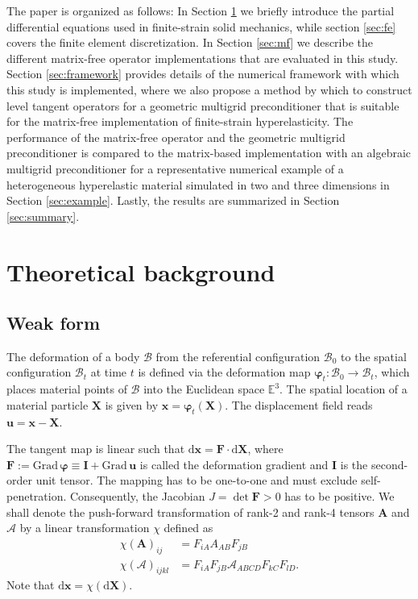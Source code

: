 \documentclass[AMA,STIX1COL]{WileyNJD-v2}
\newcommand*{\gz}[1]{\boldsymbol{#1}}
\newcommand*{\Grad}{\mathrm{Grad}}
\renewcommand*{\d}{\mathrm{d}}
\newcommand*{\mcl}[1]{\mathcal{#1}}
\begin{document}
The paper is organized as follows:
In Section \ref{sec:theory} we briefly introduce the partial differential equations used in finite-strain solid mechanics,
while section \ref{sec:fe} covers the finite element discretization.
In Section \ref{sec:mf} we describe the different matrix-free operator implementations that are evaluated in this study.
Section \ref{sec:framework} provides details of the numerical framework with which this study is implemented,
where we also propose a method by which to construct level tangent operators for
a geometric multigrid preconditioner that is suitable for the matrix-free implementation of finite-strain hyperelasticity.
%
The performance of the matrix-free operator and the geometric multigrid preconditioner is compared to the matrix-based implementation with an algebraic multigrid preconditioner for a representative numerical example of a heterogeneous hyperelastic material simulated in two and three dimensions in Section \ref{sec:example}.
Lastly, the results are summarized in Section \ref{sec:summary}.

\section{Theoretical background}
\label{sec:theory}

\subsection{Weak form}
The deformation of a body $\mcl B$ from the referential configuration $\mcl B_0$ to the spatial configuration $\mcl B_t$ at time $t$
is defined via the deformation map $\gz \varphi_t: \mcl B_0 \rightarrow \mcl B_t$, which places material points of $\mcl B$ into the Euclidean space $\mathbb E^3$.
The spatial location of a material particle $\gz X$ is given by $\gz x = \gz \varphi_t (\gz X)$.
The displacement field reads $\gz u = \gz x - \gz X$.

The tangent map is linear such that
$\d \gz x = \gz F \cdot \d \gz X$,
where $\gz F := \Grad \, \gz \varphi \equiv \gz I + \Grad \, \gz u$ is called the deformation gradient and $\gz I$ is the second-order unit tensor.
The mapping has to be one-to-one and must exclude self-penetration. Consequently, the Jacobian $J = \det \gz F > 0$ has to be positive.
We shall denote the push-forward transformation of rank-2 and rank-4 tensors $\mathbf{A}$ and $\boldsymbol{\mathcal{A}}$ by a linear transformation $\chi$ defined as
\begin{align}
  \chi\left( \mathbf{A} \right)_{ij}
  &= F_{iA} A_{AB} F_{jB} \\
  \chi\left( \boldsymbol{\mathcal{A}} \right)_{ijkl}
  &= F_{iA} F_{jB} \mathcal{A}_{ABCD} F_{kC} F_{lD}.
\end{align}
Note that $\d \gz x = \chi(\d \gz X)$.
\end{document}
